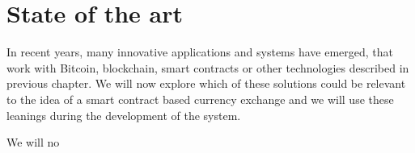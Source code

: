 \section{State of the art}
% 
In recent years, many innovative applications and systems have emerged, that work with Bitcoin, blockchain, smart contracts or other technologies described in previous chapter. We will now explore which of these solutions could be relevant to the idea of a smart contract based currency exchange and we will use these leanings during the development of the system.

We will no


% 

% 

% 

% 